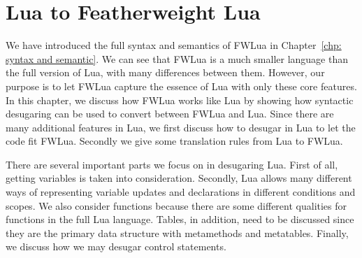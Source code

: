 \newcommand{\desugar}[2]{{#1} & \xlongequal[]{def} & {\begin{array}{@{}l@{}} #2 \end{array}}\\}
\newcommand{\definefunc}[2]{{#1} & \xlongequal[]{} & {\begin{array}{@{}l@{}} #2 \end{array}}\\}
\newcommand{\desugarline}[1]{ & & {\begin{array}{@{}l@{}} #1 \end{array}}\\}
\newcommand{\translate}[2]{\llbracket {#1} \rrbracket & \xlongequal[]{} & {\begin{array}{@{}l@{}} #2 \end{array}}\\}
\newcommand{\translateline}[1]{ &  & {\begin{array}{@{}l@{}} #1 \end{array}}\\}

\chapter{Lua to Featherweight Lua}
\label{chp:luaTranslation}

We have introduced the full syntax and semantics of FWLua in Chapter~\ref{chp: syntax and semantic}. We can see that FWLua is a much smaller language than the full version of Lua, with many differences between them.
However, our purpose is to let FWLua capture the essence of Lua with only these core features.
In this chapter, we discuss how FWLua works like Lua by showing how syntactic desugaring can be used to convert between FWLua and Lua. Since there are many additional features in Lua, we first discuss how to desugar in Lua to let the code fit FWLua. Secondly we give some translation rules from Lua to FWLua.

There are several important parts we focus on in desugaring Lua. First of all, getting variables is taken into consideration. Secondly, Lua allows many different ways of representing variable updates and declarations in different conditions and scopes. We also consider functions because there are some different qualities for functions in the full Lua language. Tables, in addition, need to be discussed since they are the primary data structure with metamethods and metatables. Finally, we discuss how we may desugar control statements. 

